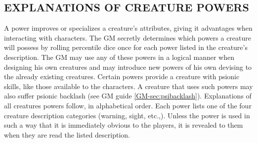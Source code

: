 
\hrulefill



\subsection*{EXPLANATIONS OF CREATURE POWERS}


A power improves or specializes a creature's attributes, giving it
advantages when interacting with characters.  The GM secretly
determines which powers a creature will possess by rolling percentile
dice once for each power listed in the creature's description. The GM
may use any of these powers in a logical manner when designing his own
creatures and may introduce new powers of his own devising to the
already existing creatures. Certain powers provide a creature with
psionic skills, like those available to the characters. A creature
that uses such powers may also suffer psionic backlash (see GM guide
\ref{GM-sec:psibacklash}).  Explanations of all creatures powers
follow, in alphabetical order.  Each power lists one of the four
creature description categories (warning, sight, etc.,). Unless the
power is used in such a way that it is immediately obvious to the
players, it is revealed to them when they are read the listed
description.

